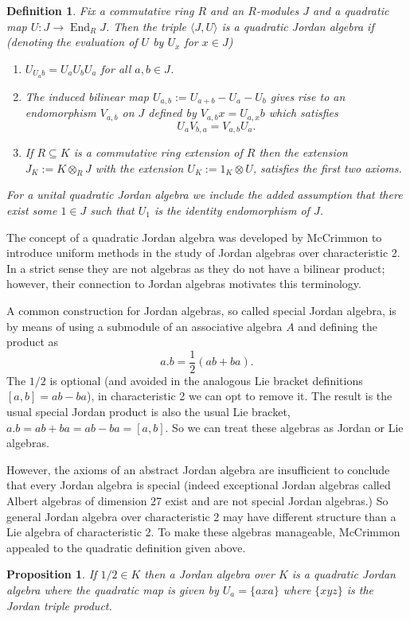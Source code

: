 \documentclass[12pt]{article}
\DeclareMathOperator{\End}{End}
\newtheorem{prop}[thm]{Proposition}
\newtheorem{defn}[thm]{Definition}
\begin{document}
\begin{defn}
Fix a commutative ring $R$ and an $R$-modules $J$ and a quadratic map
$U:J\rightarrow \End_R J$.  Then the triple $\langle J,U\rangle$ is a
\emph{quadratic Jordan algebra} if (denoting the evaluation of $U$ by $U_x$
for $x\in J$)
\begin{enumerate}
\item $U_{U_a b}=U_a U_b U_a$ for all $a,b\in J$.
\item The induced bilinear map $U_{a,b}:=U_{a+b}-U_a-U_b$ gives rise to
an endomorphism $V_{a,b}$ on $J$ defined by $V_{a,b} x=U_{a,x}b$ which satisfies
    \[U_a V_{b,a}=V_{a,b} U_a.\]
\item If $R\subseteq K$ is a commutative ring extension of $R$ then the extension
$J_K:=K\otimes_R J$ with the extension $U_K:=1_K\otimes U$, satisfies the first two axioms.
\end{enumerate}
For a unital quadratic Jordan algebra we include the added assumption
that there exist some $1\in J$ such that
$U_1$ is the identity endomorphism of $J$.
\end{defn}

The concept of a quadratic Jordan algebra was developed by McCrimmon to introduce uniform methods in the study of Jordan algebras over characteristic 2. 
In a strict sense they are not algebras as they do not have a bilinear product;
however, their connection to Jordan algebras motivates this terminology.

A common construction for Jordan algebras, so called special Jordan algebra, is by means of using a submodule of an associative algebra $A$ and defining the
product as
 \[a.b=\frac{1}{2}(ab+ba).\]
The $1/2$ is optional (and avoided in the analogous Lie bracket definitions $[a,b]=ab-ba$), in characteristic 2 we can opt to remove it.  The result
is the usual special Jordan product is also the usual Lie bracket, $a.b=ab+ba=ab-ba=[a,b]$.  So we can treat these algebras as Jordan or Lie algebras.  

However, the axioms of an abstract Jordan algebra are insufficient
to conclude that every Jordan algebra is special (indeed exceptional Jordan
algebras called Albert algebras of dimension 27 exist and are not special
Jordan algebras.)  So general Jordan algebra over characteristic 2 may have different structure than a Lie algebra of characteristic 2.  To make these
algebras manageable, McCrimmon appealed to the quadratic definition given above.

\begin{prop}
If $1/2\in K$ then a Jordan algebra over $K$ is a quadratic Jordan algebra 
where the quadratic map is given by $U_a=\{axa\}$ where $\{xyz\}$ is the Jordan triple product.
\end{prop}
\end{document}
